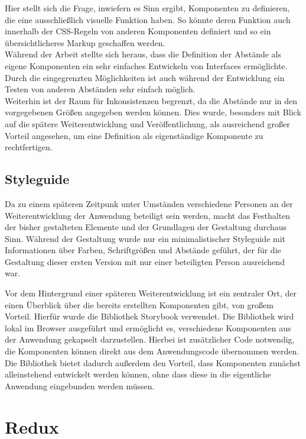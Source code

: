 Hier stellt sich die Frage, inwiefern es Sinn ergibt, Komponenten zu definieren, die eine ausschließlich visuelle Funktion haben.
So könnte deren Funktion auch innerhalb der CSS-Regeln von anderen Komponenten definiert und so ein übersichtlicheres Markup geschaffen werden.\\
Während der Arbeit stellte sich heraus, dass die Definition der Abstände als eigene Komponenten ein sehr einfaches Entwickeln von Interfaces ermöglichte. Durch die eingegrenzten Möglichkeiten ist auch während der Entwicklung ein Testen von anderen Abständen sehr einfach möglich.\\
Weiterhin ist der Raum für Inkonsistenzen begrenzt, da die Abstände nur in den vorgegebenen Größen angegeben werden können. Dies wurde, besonders mit Blick auf die spätere Weiterentwicklung und Veröffentlichung, als ausreichend großer Vorteil angesehen, um eine Definition als eigenständige Komponente zu rechtfertigen.

\subsection{Styleguide}
\label{chap:styleguide}
Da zu einem späteren Zeitpunk unter Umständen verschiedene Personen an der Weiterentwicklung der Anwendung beteiligt sein werden, macht das Festhalten der bisher gestalteten Elemente und der Grundlagen der Gestaltung durchaus Sinn.
Während der Gestaltung wurde nur ein minimalistischer Styleguide mit Informationen über Farben, Schriftgrößen und Abstände geführt, der für die Gestaltung dieser ersten Version mit nur einer beteiligten Person ausreichend war.

Vor dem Hintergrund einer späteren Weiterentwicklung ist ein zentraler Ort, der einen Überblick über die bereits erstellten Komponenten gibt, von großem Vorteil.
Hierfür wurde die Bibliothek Storybook\footnotemark{} verwendet. Die Bibliothek wird lokal im Browser ausgeführt und ermöglicht es, verschiedene Komponenten aus der Anwendung gekapselt darzustellen. Hierbei ist zusätzlicher Code notwendig, die Komponenten können direkt aus dem Anwendungscode übernommen werden.
Die Bibliothek bietet dadurch außerdem den Vorteil, dass Komponenten zunächst alleinstehend entwickelt werden können, ohne dass diese in die eigentliche Anwendung eingebunden werden müssen.


\section{Redux}
\label{chap:redux}

